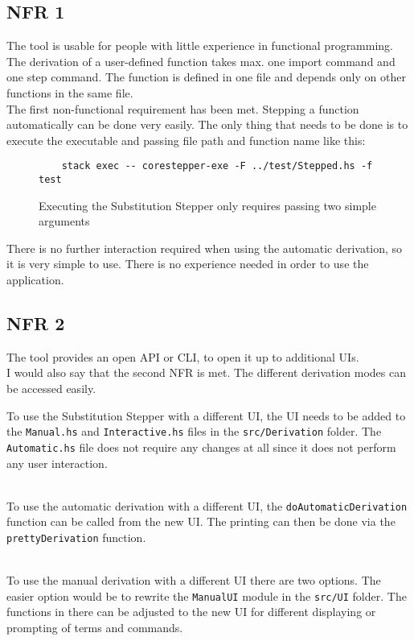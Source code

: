 \subsection{NFR 1}
The tool is usable for people with little experience in functional programming.
The derivation of a user-defined function takes max. one import command and one step command.
The function is defined in one file and depends only on other functions in the same file.
\ \\
The first non-functional requirement has been met.
Stepping a function automatically can be done very easily.
The only thing that needs to be done is to execute the executable and passing file path and function name like this:

\begin{figure}
    \begin{verbatim}
    stack exec -- corestepper-exe -F ../test/Stepped.hs -f test
    \end{verbatim}
    \caption{Executing the Substitution Stepper only requires passing two simple arguments}
\end{figure}

There is no further interaction required when using the automatic derivation,
so it is very simple to use.
There is no experience needed in order to use the application.

\subsection{NFR 2}
The tool provides an open API or CLI, to open it up to additional UIs.
\ \\
I would also say that the second NFR is met.
The different derivation modes can be accessed easily.

To use the Substitution Stepper with a different UI,
the UI needs to be added to the \texttt{Manual.hs} and \texttt{Interactive.hs} files in the \texttt{src/Derivation} folder.
The \texttt{Automatic.hs} file does not require any changes at all since it does not perform any user interaction.

\ \\
To use the automatic derivation with a different UI,
the \texttt{doAutomaticDerivation} function can be called from the new UI.
The printing can then be done via the \texttt{prettyDerivation} function.

\ \\
To use the manual derivation with a different UI there are two options.
The easier option would be to rewrite the \texttt{ManualUI} module in the \texttt{src/UI} folder.
The functions in there can be adjusted to the new UI for different displaying or prompting of terms and commands.

